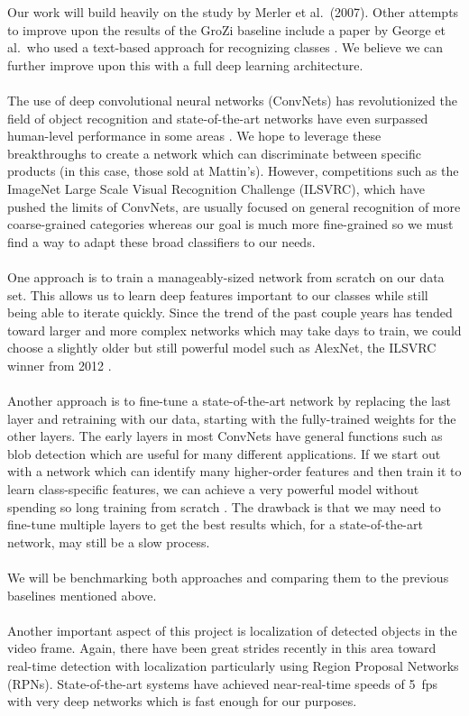 \documentclass{article}
\begin{document}
Our work will build heavily on the study by Merler et al.\ (2007). Other attempts to improve upon the results of the GroZi baseline include a paper by George et al.\ who used a text-based approach for recognizing classes \cite{george15}. We believe we can further improve upon this with a full deep learning architecture.
\\ \\
The use of deep convolutional neural networks (ConvNets) has revolutionized the field of object recognition and state-of-the-art networks have even surpassed human-level performance in some areas \cite{he15,russakovsky14}. We hope to leverage these breakthroughs to create a network which can discriminate between specific products (in this case, those sold at Mattin's). However, competitions such as the ImageNet Large Scale Visual Recognition Challenge (ILSVRC), which have pushed the limits of ConvNets, are usually focused on general recognition of more coarse-grained categories whereas our goal is much more fine-grained so we must find a way to adapt these broad classifiers to our needs.
\\ \\
One approach is to train a manageably-sized network from scratch on our data set. This allows us to learn deep features important to our classes while still being able to iterate quickly. Since the trend of the past couple years has tended toward larger and more complex networks which may take days to train, we could choose a slightly older but still powerful model such as AlexNet, the ILSVRC winner from 2012 \cite{krizhevsky12}.
\\ \\
Another approach is to fine-tune a state-of-the-art network by replacing the last layer and retraining with our data, starting with the fully-trained weights for the other layers. The early layers in most ConvNets have general functions such as blob detection which are useful for many different applications. If we start out with a network which can identify many higher-order features and then train it to learn class-specific features, we can achieve a very powerful model without spending so long training from scratch \cite{donahue13}. The drawback is that we may need to fine-tune multiple layers to get the best results which, for a state-of-the-art network, may still be a slow process.
\\ \\
We will be benchmarking both approaches and comparing them to the previous baselines mentioned above.
\\ \\
Another important aspect of this project is localization of detected objects in the video frame. Again, there have been great strides recently in this area toward real-time detection with localization particularly using Region Proposal Networks (RPNs). State-of-the-art systems have achieved near-real-time speeds of 5~fps with very deep networks which is fast enough for our purposes.
\end{document}
